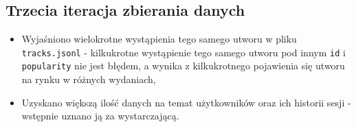 \documentclass[10pt,a4paper]{article}
\begin{document}
\subsection{Trzecia iteracja zbierania danych}
\begin{itemize}
\item Wyjaśniono wielokrotne wystąpienia tego samego utworu w pliku \texttt{tracks.jsonl} - kilkukrotne wystąpienie tego samego utworu pod innym \texttt{id} i \texttt{popularity} nie jest błędem, a wynika z kilkukrotnego pojawienia się utworu na rynku w różnych wydaniach,
\item Uzyskano większą ilość danych na temat użytkowników oraz ich historii sesji - wstępnie uznano ją za wystarczającą.
\end{itemize}
\end{document}
